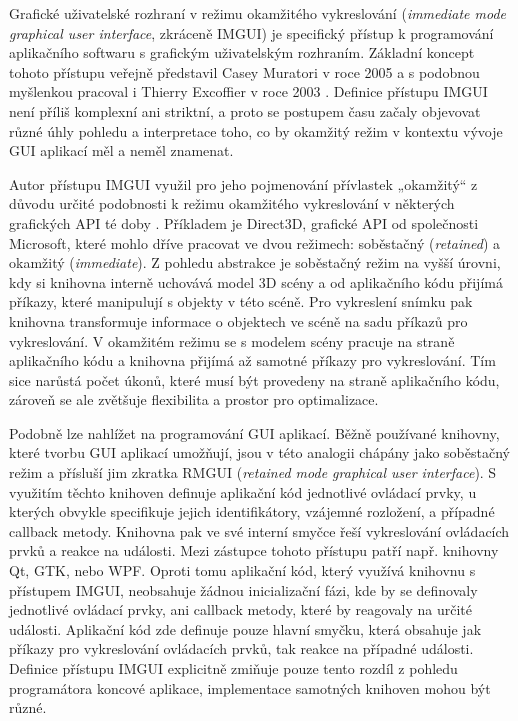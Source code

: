 \documentclass[FM,DP]{tulthesis}
\begin{document}
	Grafické uživatelské rozhraní v režimu okamžitého vykreslování (\textit{immediate \mbox{mode} graphical user interface}, zkráceně IMGUI) je specifický přístup k programování aplikačního softwaru s grafickým uživatelským rozhraním. Základní koncept tohoto přístupu veřejně představil Casey Muratori v roce 2005 a s podobnou myšlenkou pracoval i Thierry Excoffier v roce 2003 \cite{report_zeromemorywidgets}. Definice přístupu IMGUI není příliš komplexní ani striktní, a proto se postupem času začaly objevovat různé úhly pohledu a interpretace toho, co by okamžitý režim v kontextu vývoje GUI aplikací měl a neměl znamenat. \cite{online_casey}
	
	Autor přístupu IMGUI využil pro jeho pojmenování přívlastek „okamžitý“ z důvodu určité podobnosti k režimu okamžitého vykreslování v některých grafických API té doby \cite{online_casey}. Příkladem je Direct3D, grafické API od společnosti \mbox{Microsoft}, které mohlo dříve pracovat ve dvou režimech: soběstačný (\textit{retained}) a okamžitý (\textit{\mbox{immediate}}). Z pohledu abstrakce je soběstačný režim na vyšší úrovni, kdy si knihovna interně uchovává model 3D scény a od aplikačního kódu přijímá příkazy, které manipulují s objekty v této scéně. Pro vykreslení snímku pak knihovna transformuje informace o objektech ve scéně na sadu příkazů pro vykreslování. V okamžitém režimu se s modelem scény pracuje na straně aplikačního kódu a knihovna přijímá až samotné příkazy pro vykreslování. Tím sice narůstá počet úkonů, které musí být provedeny na straně aplikačního kódu, zároveň se ale zvětšuje flexibilita a prostor pro optimalizace. \cite{book_direct3dbible, online_direct2d}
	
	Podobně lze nahlížet na programování GUI aplikací. Běžně používané knihovny, které tvorbu GUI aplikací umožňují, jsou v této analogii chápány jako soběstačný režim a přísluší jim zkratka RMGUI (\textit{retained mode graphical user interface}). S využitím těchto knihoven definuje aplikační kód jednotlivé ovládací prvky, u kterých obvykle specifikuje jejich identifikátory, vzájemné rozložení, a případné callback metody. Knihovna pak ve své interní smyčce řeší vykreslování ovládacích prvků a reakce na události. Mezi zástupce tohoto přístupu patří např. knihovny Qt, GTK, nebo WPF. Oproti tomu aplikační kód, který využívá knihovnu s přístupem \mbox{IMGUI}, neobsahuje žádnou inicializační fázi, kde by se definovaly jednotlivé ovládací prvky, ani callback metody, které by reagovaly na určité události. Aplikační kód zde definuje pouze hlavní smyčku, která obsahuje jak příkazy pro vykreslování ovládacích prvků, tak reakce na případné události. Definice přístupu IMGUI explicitně zmiňuje pouze tento rozdíl z pohledu programátora koncové aplikace, implementace samotných knihoven mohou být různé. \cite{online_casey}
	
\end{document}
